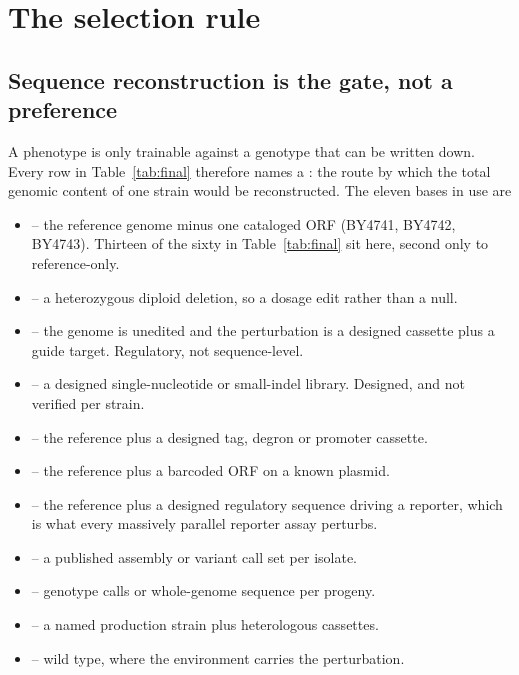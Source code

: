
\section{The selection rule}\label{sec:rule}

\subsection{Sequence reconstruction is the gate, not a preference}

A phenotype is only trainable against a genotype that can be written down. Every row in
Table~\ref{tab:final} therefore names a : the route by which the
total genomic content of one strain would be reconstructed. The eleven bases in use are

\begin{itemize}[leftmargin=1.2em,itemsep=1pt,topsep=2pt]
  \item {} -- the reference genome minus one cataloged ORF (BY4741, BY4742,
    BY4743). Thirteen of the sixty in Table~\ref{tab:final} sit here, second only to
    reference-only.
  \item {} -- a heterozygous diploid deletion, so a dosage edit rather
    than a null.
  \item {} -- the genome is unedited and the perturbation is a designed
    cassette plus a guide target. Regulatory, not sequence-level.
  \item {} -- a designed single-nucleotide or small-indel library.
    Designed, and not verified per strain.
  \item {} -- the reference plus a designed tag, degron or promoter cassette.
  \item {} -- the reference plus a barcoded ORF on a known plasmid.
  \item {} -- the reference plus a designed regulatory sequence
    driving a reporter, which is what every massively parallel reporter assay perturbs.
  \item {} -- a published assembly or variant call set per isolate.
  \item {} -- genotype calls or whole-genome sequence per progeny.
  \item {} -- a named production strain plus heterologous cassettes.
  \item {} -- wild type, where the environment carries the perturbation.
\end{itemize}

